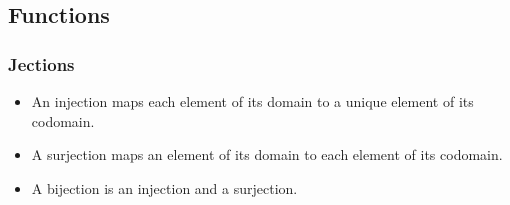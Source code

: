 \subsection{Functions}


\subsubsection{Jections}


\begin{itemize}
 \item An injection maps each element of its domain to a unique element of
       its codomain.
 \item A surjection maps an element of its domain to each element of its
       codomain.
 \item A bijection is an injection and a surjection.
\end{itemize}
